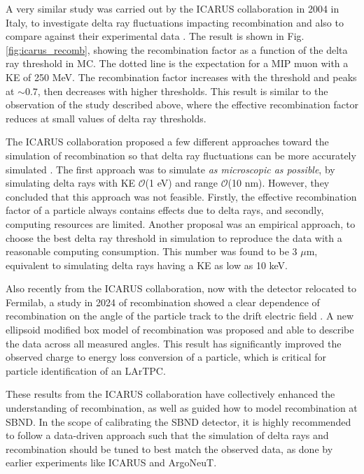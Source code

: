 A very similar study was carried out by the ICARUS collaboration in 2004 in Italy, to investigate delta ray fluctuations impacting recombination and also to compare against their experimental data \cite{icarus_recomb}. 
The result is shown in Fig. \ref{fig:icarus_recomb}, showing the recombination factor as a function of the delta ray threshold in MC. 
The dotted line is the expectation for a MIP muon with a KE of 250 MeV.
The recombination factor increases with the threshold and peaks at $\sim0.7$, then decreases with higher thresholds. 
This result is similar to the observation of the study described above, where the effective recombination factor reduces at small values of delta ray thresholds.

The ICARUS collaboration proposed a few different approaches toward the simulation of recombination so that delta ray fluctuations can be more accurately simulated \cite{icarus_recomb}. 
The first approach was to simulate \textit{as microscopic as possible}, by simulating delta rays with KE $\mathcal{O}$(1 eV) and range $\mathcal{O}$(10 nm).
However, they concluded that this approach was not feasible.
Firstly, the effective recombination factor of a particle always contains effects due to delta rays, and secondly, computing resources are limited.
Another proposal was an empirical approach, to choose the best delta ray threshold in simulation to reproduce the data with a reasonable computing consumption.
This number was found to be 3 $\mu$m, equivalent to simulating delta rays having a KE as low as 10 keV.


Also recently from the ICARUS collaboration, now with the detector relocated to Fermilab, a study in 2024 of recombination showed a clear dependence of recombination on the angle of the particle track to the drift electric field \cite{TODO}.
A new ellipsoid modified box model of recombination was proposed and able to describe the data across all measured angles. 
This result has significantly improved the observed charge to energy loss conversion of a particle, which is critical for particle identification of an LArTPC.   

These results from the ICARUS collaboration have collectively enhanced the understanding of recombination, as well as guided how to model recombination at SBND.
In the scope of calibrating the SBND detector, it is highly recommended to follow a data-driven approach such that the simulation of delta rays and recombination should be tuned to best match the observed data, as done by earlier experiments like ICARUS and ArgoNeuT.

